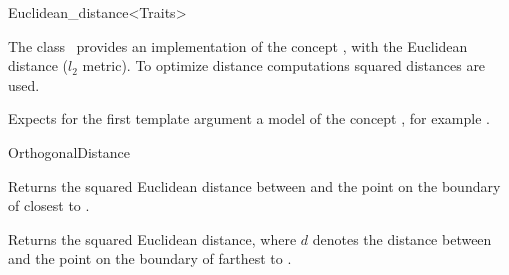 

\begin{ccRefClass}{Euclidean_distance<Traits>}  %


\ccDefinition
  
The class \ccRefName\ provides an implementation of the concept , with the
Euclidean distance ($l_2$ metric).
To optimize distance computations squared distances are used.



\ccParameters

Expects for the first template argument a model of the concept
, for example .



\ccIsModel

OrthogonalDistance

\ccTypes


\ccCreation
{}  %


\ccOperations
 

{Returns the squared Euclidean distance between  and
the point on the boundary of  closest to .}

{Returns the squared Euclidean distance, where $d$ denotes the distance between  and
the point on the boundary of  farthest to .}


\end{ccRefClass}
